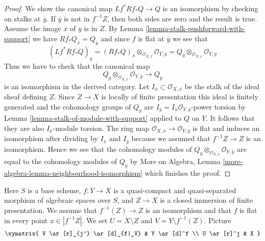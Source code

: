\begin{proof}
We show the canonical map $Lf^*Rf_*Q \to Q$ is an isomorphism
by checking on stalks at $\overline{y}$. If $\overline{y}$ is not
in $f^{-1}Z$, then both sides are zero and the result is true.
Assume the image $\overline{x}$ of $\overline{y}$ is in $Z$.
By Lemma \ref{lemma-stalk-pushforward-with-support} we have
$Rf_*Q_{\overline{x}} = Q_{\overline{y}}$ and since $f$ is flat
at $\overline{y}$ we see that
$$
(Lf^*Rf_*Q)_{\overline{y}} =
(Rf_*Q)_{\overline{x}}
\otimes_{\mathcal{O}_{X, \overline{x}}}
\mathcal{O}_{Y, \overline{y}} =
Q_{\overline{y}} \otimes_{\mathcal{O}_{X, \overline{x}}}
\mathcal{O}_{Y, \overline{y}}
$$
Thus we have to check that the canonical map
$$
Q_{\overline{y}} \otimes_{\mathcal{O}_{X, \overline{x}}}
\mathcal{O}_{Y, \overline{y}}
\longrightarrow Q_{\overline{y}}
$$
is an isomorphism in the derived category. Let
$I_{\overline{x}} \subset \mathcal{O}_{X, \overline{x}}$ be the
stalk of the ideal sheaf defining $Z$. Since $Z \to X$ is locally of
finite presentation this ideal is finitely generated and the
cohomology groups of $Q_{\overline{y}}$
are $I_{\overline{y}} = I_{\overline{x}}\mathcal{O}_{Y, \overline{y}}$-power
torsion by Lemma \ref{lemma-stalk-of-module-with-support} applied to $Q$ on $Y$.
It follows that they are also $I_{\overline{x}}$-module torsion.
The ring map
$\mathcal{O}_{X, \overline{x}} \to \mathcal{O}_{Y, \overline{y}}$
is flat and induces an isomorphism after dividing by
$I_{\overline{x}}$ and $I_{\overline{y}}$ because we assumed
that $f^{-1}Z \to Z$ is an isomorphism. Hence we see that
the cohomology modules of
$Q_{\overline{y}} \otimes_{\mathcal{O}_{X, \overline{x}}}
\mathcal{O}_{Y, \overline{y}}$
are equal to the cohomology modules of $Q_{\overline{y}}$ by
More on Algebra, Lemma \ref{more-algebra-lemma-neighbourhood-isomorphism}
which finishes the proof.
\end{proof}

\begin{situation}
\label{situation-formal-glueing}
Here $S$ is a base scheme, $f : Y \to X$ is a quasi-compact
and quasi-separated morphism of algebraic spaces over $S$, and
$Z \to X$ is a closed immersion of finite presentation. We assume that
$f^{-1}(Z) \to Z$ is an isomorphism and that $f$ is flat in every
point $x \in |f^{-1}Z|$. We set $U = X \setminus Z$ and
$V = Y \setminus f^{-1}(Z)$.
Picture
$$
\xymatrix{
V \ar[r]_{j'} \ar[d]_{f|_V} & Y \ar[d]^f \\
U \ar[r]^j & X
}
$$
\end{situation}

